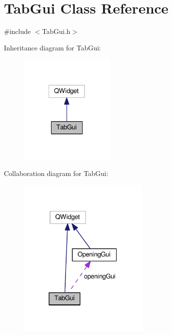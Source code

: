 \hypertarget{class_tab_gui}{\section{Tab\-Gui Class Reference}
\label{class_tab_gui}
}


{\ttfamily \#include $<$Tab\-Gui.\-h$>$}



Inheritance diagram for Tab\-Gui\-:\nopagebreak
\begin{figure}[H]
\begin{center}
\leavevmode
\includegraphics[width=134pt]{class_tab_gui__inherit__graph}
\end{center}
\end{figure}


Collaboration diagram for Tab\-Gui\-:\nopagebreak
\begin{figure}[H]
\begin{center}
\leavevmode
\includegraphics[width=184pt]{class_tab_gui__coll__graph}
\end{center}
\end{figure}
